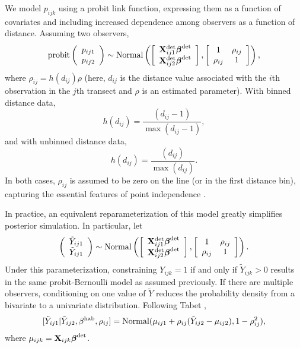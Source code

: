 \documentclass[10pt]{article}
\begin{document}
We model $p_{ijk}$ using a probit link function, expressing them as a function of covariates and including increased dependence among observers as a function of distance.  Assuming two observers,
$$
{\rm probit} \left(\begin{array}{c}
				p_{ij1} \\
				p_{ij2}
		\end{array}\right) \sim {\rm Normal}
\left( \left[ \begin{array}{c}
				{\bf X}_{ij1}^{\rm det} \boldsymbol{\beta}^{\rm det}\\
				{\bf X}_{ij2}^{\rm det} \boldsymbol{\beta}^{\rm det}
		\end{array}\right],
        \left[ \begin{array}{cc}
            1 & \rho_{ij} \\
            \rho_{ij} & 1
        \end{array} \right]
\right),
$$
where $\rho_{ij} = h(d_{ij}) \rho$ (here, $d_{ij}$ is the distance value associated with the $i$th observation in the $j$th transect and $\rho$ is an estimated parameter).  With binned distance data,
$$
h(d_{ij})=\frac{(d_{ij}-1)}{\max(d_{ij}-1)},
$$
and with unbinned distance data,
$$
h(d_{ij})=\frac{(d_{ij})}{\max(d_{ij})}.
$$
In both cases, $\rho_{ij}$ is assumed to be zero on the line (or in the first distance bin), capturing the essential features of point independence \cite{BorchersEtAl2006,BucklandEtAl2010}.

In practice, an equivalent reparameterization of this model greatly simplifies posterior simulation. In particular, let
$$
\left(\begin{array}{c}
				\tilde{Y}_{ij1} \\
				\tilde{Y}_{ij1}
		\end{array}\right) \sim {\rm Normal}
\left( \left[ \begin{array}{c}
				{\bf X}_{ij1}^{\rm det} \boldsymbol{\beta}^{\rm det}\\
				{\bf X}_{ij2}^{\rm det} \boldsymbol{\beta}^{\rm det}
		\end{array}\right],
        \left[ \begin{array}{cc}
            1 & \rho_{ij} \\
            \rho_{ij} & 1
        \end{array} \right]
\right).
$$
Under this parameterization, constraining $Y_{ijk}=1$ if and only if $\tilde{Y}_{ijk}>0$ results in the same probit-Bernoulli model as assumed previously.
If there are multiple observers, conditioning on one value of $\tilde{Y}$ reduces the probability density from a bivariate to a univariate distribution.  Following Tabet \cite{Tabet2007},
$$
[\tilde{Y}_{ij1} | \tilde{Y}_{ij2},\beta^{\rm hab},\rho_{ij}]={\rm Normal}(\mu_{ij1}+\rho_{ij}(\tilde{Y}_{ij2}-\mu_{ij2}),1-\rho_{ij}^2),
$$
where $\mu_{ijk}={\bf X}_{ijk} \boldsymbol{\beta}^{\rm det}$.
\end{document}
